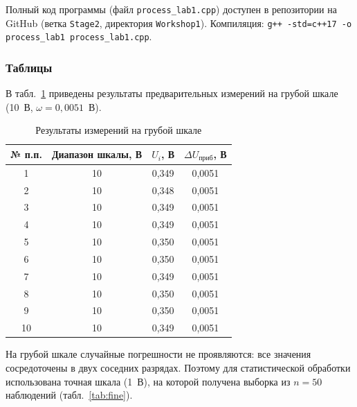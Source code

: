 \documentclass[12pt,a4paper]{article}
\begin{document}
Полный код программы (файл \texttt{process\_lab1.cpp}) доступен в репозитории на GitHub
(ветка \texttt{Stage2}, директория \texttt{Workshop1}).
Компиляция: \texttt{g++ -std=c++17 -o process\_lab1 process\_lab1.cpp}.

\subsubsection{Таблицы}

В табл.~\ref{tab:coarse} приведены результаты предварительных измерений на
грубой шкале (10~В, $\omega = 0{,}0051$~В).

\begin{table}[h]
\centering
\caption{Результаты измерений на грубой шкале}
\label{tab:coarse}
\begin{tabular}{cccc}
\toprule
№ п.п. & Диапазон шкалы, В & $U_i$, В & $\Delta U_{\text{приб}}$, В \\
\midrule
1  & 10 & 0,349 & 0,0051 \\
2  & 10 & 0,348 & 0,0051 \\
3  & 10 & 0,349 & 0,0051 \\
4  & 10 & 0,349 & 0,0051 \\
5  & 10 & 0,350 & 0,0051 \\
6  & 10 & 0,350 & 0,0051 \\
7  & 10 & 0,349 & 0,0051 \\
8  & 10 & 0,350 & 0,0051 \\
9  & 10 & 0,350 & 0,0051 \\
10 & 10 & 0,349 & 0,0051 \\
\bottomrule
\end{tabular}
\end{table}

На грубой шкале случайные погрешности не проявляются: все значения сосредоточены
в двух соседних разрядах. Поэтому для статистической обработки использована
точная шкала (1~В), на которой получена выборка из $n = 50$ наблюдений
(табл.~\ref{tab:fine}).
\end{document}
